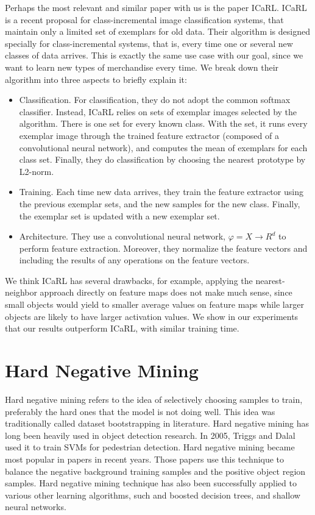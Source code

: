 Perhaps the most relevant and similar paper with us is the paper ICaRL\cite{rebuffi2017icarl}. ICaRL\cite{rebuffi2017icarl} is a recent proposal for class-incremental image classification systems, that maintain only a limited set of exemplars for old data. Their algorithm is designed specially for class-incremental systems, that is, every time one or several new classes of data arrives. This is exactly the same use case with our goal, since we want to learn new types of merchandise every time. We break down their algorithm into three aspects to briefly explain it:
\begin{itemize}
	\item Classification. For classification, they do not adopt the common softmax classifier. Instead, ICaRL relies on sets of exemplar images selected by the algorithm. There is one set for every known class. With the set, it runs every exemplar image through the trained feature extractor (composed of a convolutional neural network), and computes the mean of exemplars for each class set. Finally, they do classification by choosing the nearest prototype by L2-norm.
	\item Training. Each time new data arrives, they train the feature extractor using the previous exemplar sets, and the new samples for the new class. Finally, the exemplar set is updated with a new exemplar set.
	\item Architecture. They use a convolutional neural network, $\varphi=X\to R^d$ to perform feature extraction. Moreover, they normalize the feature vectors and including the results of any operations on the feature vectors.
\end{itemize}
We think ICaRL has several drawbacks, for example, applying the nearest-neighbor approach directly on feature maps does not make much sense, since small objects would yield to smaller average values on feature maps while larger objects are likely to have larger activation values. We show in our experiments that our results outperform ICaRL, with similar training time.

\section{Hard Negative Mining}

Hard negative mining refers to the idea of selectively choosing samples to train, preferably the hard ones that the model is not doing well. This idea was traditionally called dataset bootstrapping in literature\cite{sung1996learning}. Hard negative mining has long been heavily used in object detection research. In 2005, Triggs and Dalal\cite{dalal2005histograms} used it to train SVMs for pedestrian detection. Hard negative mining became most popular in papers in recent years\cite{shrivastava2016training,liu2016ssd,girshick2014rich,girshick2015fast,ren2015faster}. Those papers use this technique to balance the negative background training samples and the positive object region samples. Hard negative mining technique has also been successfully applied to various other learning algorithms, such and boosted decision trees, and shallow neural networks. 

